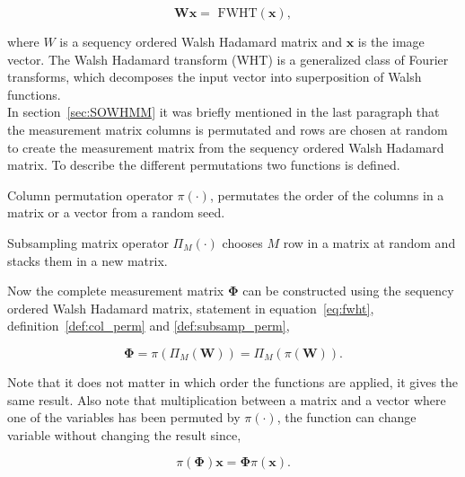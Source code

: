 \begin{equation}
\mathbf{W}\mathbf{x} = \text{ FWHT}(\mathbf{x}),
\label{eq:fwht}
\end{equation}

where $W$ is a sequency ordered Walsh Hadamard matrix and $\mathbf{x}$ is the image vector. The Walsh Hadamard transform (WHT) is a generalized class of Fourier transforms, which decomposes the input vector into superposition of Walsh functions.\\[0.1in]

In section~\ref{sec:SOWHMM} it was briefly mentioned in the last paragraph that the measurement matrix columns is permutated and rows are chosen at random to create the measurement matrix from the sequency ordered Walsh Hadamard matrix. To describe the different permutations two functions is defined.\\[0.1in] 

\theoremstyle{definition}
\begin{definition}{Column permutation operator}
$\pi(\cdot)$, permutates the order of the columns in a matrix or a vector from a random seed.
\label{def:col_perm}
\end{definition}

\theoremstyle{definition}
\begin{definition}{Subsampling matrix operator}
$\Pi_M(\cdot)$ chooses $M$ row in a matrix at random and stacks them in a new matrix.
\label{def:subsamp_perm}
\end{definition}


Now the complete measurement matrix $\mathbf{\Phi}$ can be constructed using the sequency ordered Walsh Hadamard matrix, statement in equation~\ref{eq:fwht}, definition~\ref{def:col_perm} and \ref{def:subsamp_perm},


\begin{equation}
\mathbf{\Phi} = \pi(\Pi_M(\mathbf{W})) = \Pi_M(\pi(\mathbf{W}))\text{.}
\end{equation}

Note that it does not matter in which order the functions are applied, it gives the same result. Also note that multiplication between a matrix and a vector where one of the variables has been permuted by $\pi(\cdot)$, the function can change variable without changing the result since,

\begin{equation}
\pi(\mathbf{\Phi})\mathbf{x} = \mathbf{\Phi}\pi(\mathbf{x})\text{.}
\label{eq:pi_trans}
\end{equation}


